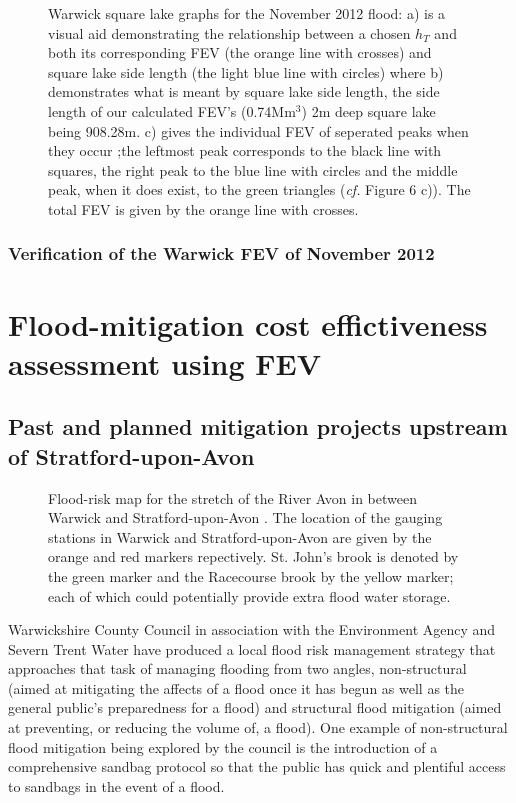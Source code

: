 \documentclass[11pt,a4paper]{article}
\begin{document}
\begin{figure}[H]
\centering
{}
\hfill
{}
\caption{Warwick square lake graphs for the November 2012 flood: a) is a visual aid demonstrating the relationship between a chosen $h_T$ and both its corresponding FEV (the orange line with crosses) and square lake side length (the light blue line with circles) where b) demonstrates what is meant by square lake side length, the side length of our calculated FEV's (0.74Mm$^3$) 2m deep square lake being 908.28m. c) gives the individual FEV of seperated peaks when they occur {;}the leftmost peak corresponds to the black line with squares, the right peak to the blue line with circles and the middle peak, when it does exist, to the green triangles (\textit{cf.} Figure 6 c)). The total FEV is given by the orange line with crosses.}
\end{figure}

\subsubsection{Verification of the Warwick FEV of November 2012}

\newpage
\section{Flood-mitigation cost effictiveness assessment using FEV}
\subsection{Past and planned mitigation projects upstream of Stratford-upon-Avon}
\begin{figure}[H]
\begin{center}
\caption{Flood-risk map for the stretch of the River Avon in between Warwick and Stratford-upon-Avon \cite{flood-risk}. The location of the gauging stations in Warwick and Stratford-upon-Avon are given by the orange and red markers repectively. St. John's brook is denoted by the green marker and the Racecourse brook by the yellow marker{;} each of which could potentially provide extra flood water storage.}
\end{center}
\end{figure}

Warwickshire County Council in association with the Environment Agency and Severn Trent Water have produced a local flood risk management strategy \cite{war1} that approaches that task of managing flooding from two angles, non-structural (aimed at mitigating the affects of a flood once it has begun as well as the general public's preparedness for a flood) and structural flood mitigation (aimed at preventing, or reducing the volume of, a flood). One example of non-structural flood mitigation being explored by the council is the introduction of a comprehensive sandbag protocol so that the public has quick and plentiful access to sandbags in the event of a flood. 
\end{document}
